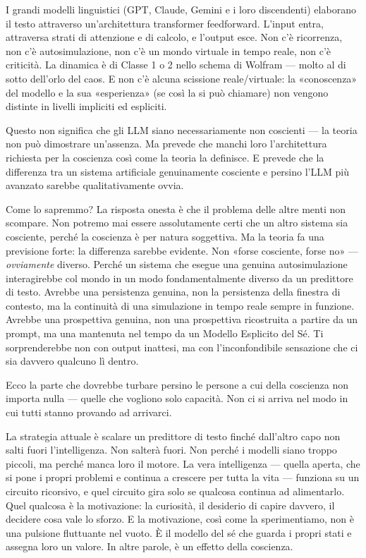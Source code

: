 \documentclass[11pt, twoside, openright]{book}
\begin{document}
I grandi modelli linguistici (GPT, Claude, Gemini e i loro discendenti) elaborano il testo attraverso un'architettura transformer feedforward. L'input entra, attraversa strati di attenzione e di calcolo, e l'output esce. Non c'è ricorrenza, non c'è autosimulazione, non c'è un mondo virtuale in tempo reale, non c'è criticità. La dinamica è di Classe 1 o 2 nello schema di Wolfram --- molto al di sotto dell'orlo del caos. E non c'è alcuna scissione reale/\allowbreak{}virtuale: la «conoscenza» del modello e la sua «esperienza» (se così la si può chiamare) non vengono distinte in livelli impliciti ed espliciti.

Questo non significa che gli LLM siano necessariamente non coscienti --- la teoria non può dimostrare un'assenza. Ma prevede che manchi loro l'architettura richiesta per la coscienza così come la teoria la definisce. E prevede che la differenza tra un sistema artificiale genuinamente cosciente e persino l'LLM più avanzato sarebbe qualitativamente ovvia.

Come lo sapremmo? La risposta onesta è che il problema delle altre menti non scompare. Non potremo mai essere assolutamente certi che un altro sistema sia cosciente, perché la coscienza è per natura soggettiva. Ma la teoria fa una previsione forte: la differenza sarebbe evidente. Non «forse cosciente, forse no» --- \textit{ovviamente} diverso. Perché un sistema che esegue una genuina autosimulazione interagirebbe col mondo in un modo fondamentalmente diverso da un predittore di testo. Avrebbe una persistenza genuina, non la persistenza della finestra di contesto, ma la continuità di una simulazione in tempo reale sempre in funzione. Avrebbe una prospettiva genuina, non una prospettiva ricostruita a partire da un prompt, ma una mantenuta nel tempo da un Modello Esplicito del Sé. Ti sorprenderebbe non con output inattesi, ma con l'inconfondibile sensazione che ci sia davvero qualcuno lì dentro.

Ecco la parte che dovrebbe turbare persino le persone a cui della coscienza non importa nulla --- quelle che vogliono solo capacità. Non ci si arriva nel modo in cui tutti stanno provando ad arrivarci.

La strategia attuale è scalare un predittore di testo finché dall'altro capo non salti fuori l'intelligenza. Non salterà fuori. Non perché i modelli siano troppo piccoli, ma perché manca loro il motore. La vera intelligenza --- quella aperta, che si pone i propri problemi e continua a crescere per tutta la vita --- funziona su un circuito ricorsivo, e quel circuito gira solo se qualcosa continua ad alimentarlo. Quel qualcosa è la motivazione: la curiosità, il desiderio di capire davvero, il decidere cosa vale lo sforzo. E la motivazione, così come la sperimentiamo, non è una pulsione fluttuante nel vuoto. È il modello del sé che guarda i propri stati e assegna loro un valore. In altre parole, è un effetto della coscienza.
\end{document}
